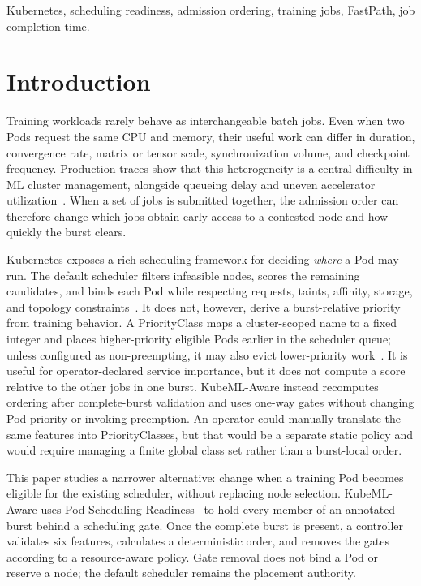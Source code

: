 \documentclass[10pt,journal,compsoc]{IEEEtran}
\newcommand{\system}{KubeML-Aware}
\begin{document}
\begin{IEEEkeywords}
Kubernetes, scheduling readiness, admission ordering, training jobs, FastPath, job completion time.
\end{IEEEkeywords}

\section{Introduction}

Training workloads rarely behave as interchangeable batch jobs. Even when two Pods request the same CPU and memory, their useful work can differ in duration, convergence rate, matrix or tensor scale, synchronization volume, and checkpoint frequency. Production traces show that this heterogeneity is a central difficulty in ML cluster management, alongside queueing delay and uneven accelerator utilization~\cite{weng2022mlaas}. When a set of jobs is submitted together, the admission order can therefore change which jobs obtain early access to a contested node and how quickly the burst clears.

Kubernetes exposes a rich scheduling framework for deciding \emph{where} a Pod may run. The default scheduler filters infeasible nodes, scores the remaining candidates, and binds each Pod while respecting requests, taints, affinity, storage, and topology constraints~\cite{kubernetesSchedulingFramework}. It does not, however, derive a burst-relative priority from training behavior. A PriorityClass maps a cluster-scoped name to a fixed integer and places higher-priority eligible Pods earlier in the scheduler queue; unless configured as non-preempting, it may also evict lower-priority work~\cite{kubernetesPriority}. It is useful for operator-declared service importance, but it does not compute a score relative to the other jobs in one burst. \system{} instead recomputes ordering after complete-burst validation and uses one-way gates without changing Pod priority or invoking preemption. An operator could manually translate the same features into PriorityClasses, but that would be a separate static policy and would require managing a finite global class set rather than a burst-local order.

This paper studies a narrower alternative: change when a training Pod becomes eligible for the existing scheduler, without replacing node selection. \system{} uses Pod Scheduling Readiness~\cite{kubernetesSchedulingReadiness} to hold every member of an annotated burst behind a scheduling gate. Once the complete burst is present, a controller validates six features, calculates a deterministic order, and removes the gates according to a resource-aware policy. Gate removal does not bind a Pod or reserve a node; the default scheduler remains the placement authority.
\end{document}
